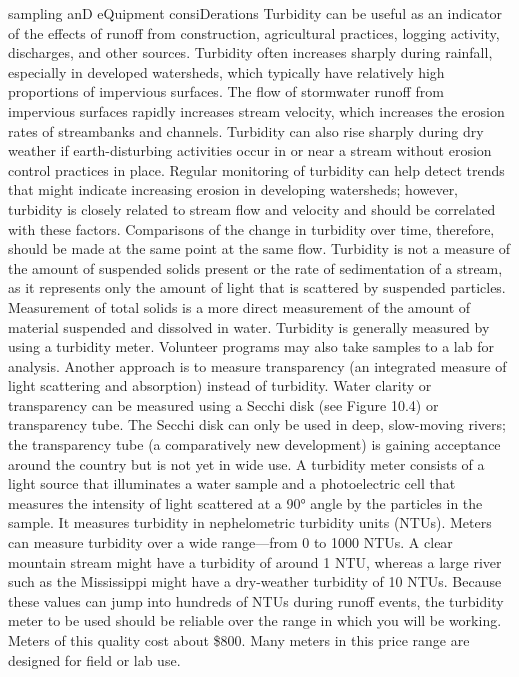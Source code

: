 \documentclass{article}
\begin{document}
sampling anD eQuipment consiDerations Turbidity can be useful as an
indicator of the effects of runoff from construction, agricultural
practices, logging activity, discharges, and other sources. Turbidity
often increases sharply during rainfall, especially in developed
watersheds, which typically have relatively high proportions of
impervious surfaces. The flow of stormwater runoff from impervious
surfaces rapidly increases stream velocity, which increases the erosion
rates of streambanks and channels. Turbidity can also rise sharply
during dry weather if earth-disturbing activities occur in or near a
stream without erosion control practices in place. Regular monitoring of
turbidity can help detect trends that might indicate increasing erosion
in developing watersheds; however, turbidity is closely related to
stream flow and velocity and should be correlated with these factors.
Comparisons of the change in turbidity over time, therefore, should be
made at the same point at the same flow. Turbidity is not a measure of
the amount of suspended solids present or the rate of sedimentation of a
stream, as it represents only the amount of light that is scattered by
suspended particles. Measurement of total solids is a more direct
measurement of the amount of material suspended and dissolved in water.
Turbidity is generally measured by using a turbidity meter. Volunteer
programs may also take samples to a lab for analysis. Another approach
is to measure transparency (an integrated measure of light scattering
and absorption) instead of turbidity. Water clarity or transparency can
be measured using a Secchi disk (see Figure 10.4) or transparency tube.
The Secchi disk can only be used in deep, slow-moving rivers; the
transparency tube (a comparatively new development) is gaining
acceptance around the country but is not yet in wide use. A turbidity
meter consists of a light source that illuminates a water sample and a
photoelectric cell that measures the intensity of light scattered at a
90° angle by the particles in the sample. It measures turbidity in
nephelometric turbidity units (NTUs). Meters can measure turbidity over
a wide range---from 0 to 1000 NTUs. A clear mountain stream might have a
turbidity of around 1 NTU, whereas a large river such as the Mississippi
might have a dry-weather turbidity of 10 NTUs. Because these values can
jump into hundreds of NTUs during runoff events, the turbidity meter to
be used should be reliable over the range in which you will be working.
Meters of this quality cost about \$800. Many meters in this price range
are designed for field or lab use.
\end{document}

